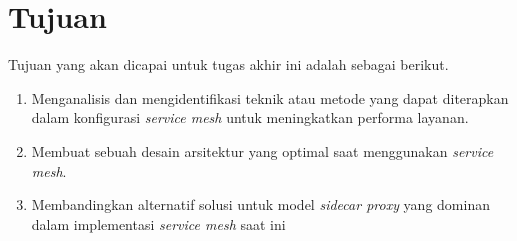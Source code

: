 \section{Tujuan}

Tujuan yang akan dicapai untuk tugas akhir ini adalah sebagai berikut.

\begin{enumerate}
    \item Menganalisis dan mengidentifikasi teknik atau metode yang dapat diterapkan dalam konfigurasi \textit{service mesh} untuk meningkatkan performa layanan.
    \item Membuat sebuah desain arsitektur yang optimal saat menggunakan \textit{service mesh}.
    \item Membandingkan alternatif solusi untuk model \textit{sidecar proxy} yang dominan dalam implementasi \textit{service mesh} saat ini
\end{enumerate}